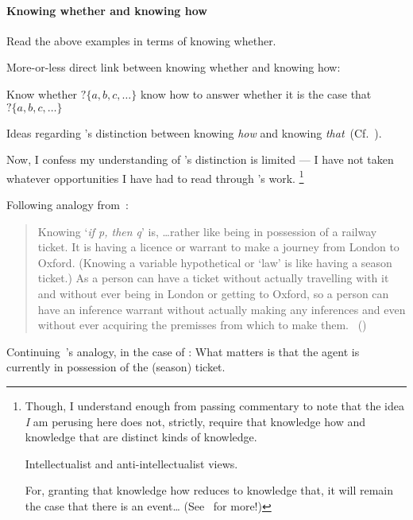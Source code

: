 \paragraph{Knowing whether and knowing how}

\begin{note}
  Read the above examples in terms of knowing whether.

  More-or-less direct link between knowing whether and knowing how:

  Know whether \(?\{a,b,c,\dots\}\) know how to answer whether it is the case that \(?\{a,b,c,\dots\}\)
\end{note}

\begin{note}
  Ideas regarding \citeauthor{Ryle:1946tu}'s distinction between knowing \emph{how} and knowing \emph{that}~(Cf.~\citeyear{Ryle:1946tu}).

  Now, I confess my understanding of \citeauthor{Ryle:1946tu}'s distinction is limited --- I have not taken whatever opportunities I have had to read through \citeauthor{Ryle:1946tu}'s work.%
  \footnote{
    Though, I understand enough from passing commentary to note that the idea \emph{I} am perusing here does not, strictly, require that knowledge how and knowledge that are distinct kinds of knowledge.

    Intellectualist and anti-intellectualist views.

    For, granting that knowledge how reduces to knowledge that, it will remain the case that there is an event\dots
    (See~\textcite{Pavese:2022up} for more!)
  }

  Following analogy from~\textcite{Ryle:2009us}:

  \begin{quote}
    Knowing `\emph{if p, then q}' is, \dots rather like being in possession of a railway ticket.
    It is having a licence or warrant to make a journey from London to Oxford.
    (Knowing a variable hypothetical or `law' is like having a season ticket.)
    As a person can have a ticket without actually travelling with it and without ever being in London or getting to Oxford, so a person can have an inference warrant without actually making any inferences and even without ever acquiring the premisses from which to make them.%
    \mbox{ }\hfill\mbox{(\citeyear[250]{Ryle:2009us})}
  \end{quote}

  Continuing~\citeauthor{Ryle:2009us}'s analogy, in the case of :
  What matters is that the agent is currently in possession of the (season) ticket.
\end{note}

